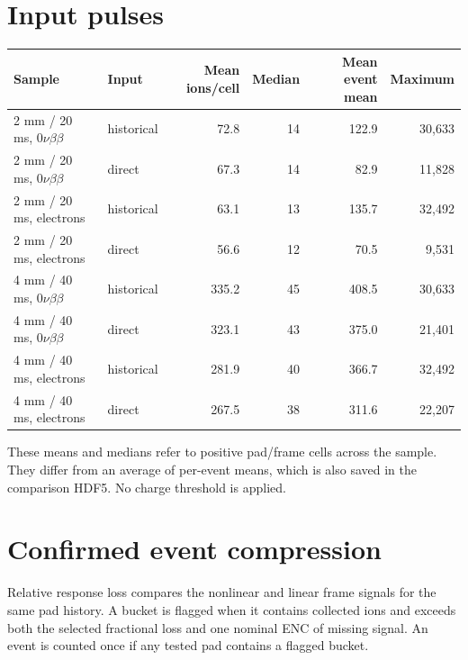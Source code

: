 \documentclass[11pt,a4paper]{article}
\begin{document}
\section{Input pulses}
\begin{center}\small\begin{tabular}{llrrrr}\toprule
Sample & Input & Mean ions/cell & Median & Mean event mean & Maximum\\\midrule
2 mm / 20 ms, $0\nu\beta\beta$ & historical & 72.8 & 14 & 122.9 & 30,633 \\
2 mm / 20 ms, $0\nu\beta\beta$ & direct & 67.3 & 14 & 82.9 & 11,828 \\
2 mm / 20 ms, electrons & historical & 63.1 & 13 & 135.7 & 32,492 \\
2 mm / 20 ms, electrons & direct & 56.6 & 12 & 70.5 & 9,531 \\
4 mm / 40 ms, $0\nu\beta\beta$ & historical & 335.2 & 45 & 408.5 & 30,633 \\
4 mm / 40 ms, $0\nu\beta\beta$ & direct & 323.1 & 43 & 375.0 & 21,401 \\
4 mm / 40 ms, electrons & historical & 281.9 & 40 & 366.7 & 32,492 \\
4 mm / 40 ms, electrons & direct & 267.5 & 38 & 311.6 & 22,207 \\
\bottomrule\end{tabular}\end{center}
These means and medians refer to positive pad/frame cells across the sample.
They differ from an average of per-event means, which is also saved in the
comparison HDF5. No charge threshold is applied.

\section{Confirmed event compression}
Relative response loss compares the nonlinear and linear frame signals for the
same pad history. A bucket is flagged when it contains collected ions and
exceeds both the selected fractional loss and one nominal ENC of missing
signal. An event is counted once if any tested pad contains a flagged bucket.
\end{document}
